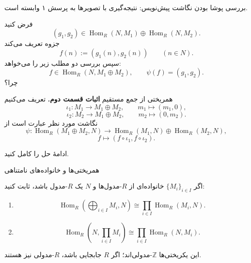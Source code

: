 \begin{frame}[t]{بررسی پوشا بودن نگاشت}
    \label{lec07:hom-into-sum-surjectivity}
    \alert{پیش‌نویس: نتیجه‌گیری با تصویرها به پرسش ۱ وابسته است.}
    \medskip

    فرض کنید
    \[
        (g_1,g_2)\in\operatorname{Hom}_R(N,M_1)\oplus\operatorname{Hom}_R(N,M_2).
    \]
    جزوه تعریف می‌کند
    \[
        f(n):=(g_1(n),g_2(n))\qquad(n\in N).
    \]
    سپس بررسی دو مطلب زیر را می‌خواهد:
    \[
        f\in\operatorname{Hom}_R(N,M_1\oplus M_2),\qquad
        \psi(f)=(g_1,g_2).
    \]
    \alert{چرا؟}
\end{frame}

\begin{frame}[t]{همریختی از جمع مستقیم}
    \label{lec07:hom-out-of-sum}
    \textbf{اثبات قسمت دوم.} تعریف می‌کنیم
    \[
        \iota_1:M_1\longrightarrow M_1\oplus M_2,\qquad m_1\longmapsto(m_1,0),
    \]
    \[
        \iota_2:M_2\longrightarrow M_1\oplus M_2,\qquad m_2\longmapsto(0,m_2).
    \]
    نگاشت مورد نظر عبارت است از
    \[
        \psi:\operatorname{Hom}_R(M_1\oplus M_2,N)
        \longrightarrow\operatorname{Hom}_R(M_1,N)\oplus\operatorname{Hom}_R(M_2,N),
    \]
    \[
        f\longmapsto(f\circ\iota_1,f\circ\iota_2).
    \]
    \begin{exercise}
        ادامهٔ حل را کامل کنید.
    \end{exercise}
\end{frame}

\begin{frame}[t]{همریختی‌ها و خانواده‌های نامتناهی}
    \label{lec07:hom-infinite-families}
    \begin{exercise}
        اگر \(\{M_i\}_{i\in I}\) خانواده‌ای از \(R\)-مدول‌ها و \(N\) یک \(R\)-مدول باشد، ثابت کنید:
        \begin{enumerate}
            \item
            \[
                \operatorname{Hom}_R\!\left(\bigoplus_{i\in I}M_i,N\right)
                \cong\prod_{i\in I}\operatorname{Hom}_R(M_i,N).
            \]
            \item
            \[
                \operatorname{Hom}_R\!\left(N,\prod_{i\in I}M_i\right)
                \cong\prod_{i\in I}\operatorname{Hom}_R(N,M_i).
            \]
        \end{enumerate}
        این یکریختی‌ها \(\mathbb Z\)-مدولی‌اند؛ اگر \(R\) جابجایی باشد، \(R\)-مدولی نیز هستند.
    \end{exercise}
\end{frame}

